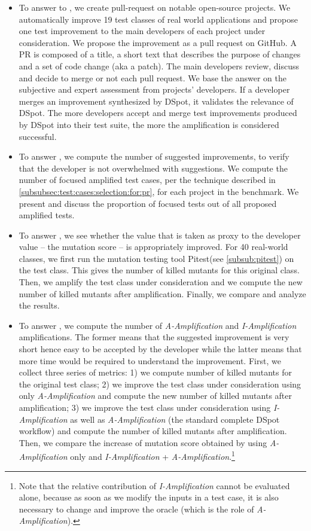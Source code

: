 \documentclass[table,xcdraw,smallextended]{svjour3}
\newcommand{\Iampl}{\emph{I-Amplification}\xspace}
\newcommand{\Aampl}{\emph{A-Amplification}\xspace}
\newcommand{\dspot}{DSpot\xspace}
\newcommand{\gh}{GitHub\xspace}
\newcommand{\pitest}{Pitest\xspace}
\newcommand{\ms}{mutation score\xspace}
\newcommand{\ams}{number of killed mutants\xspace}
\begin{document}
\begin{itemize}
\item \textbf{\rqpullrequest}
To answer to \rqpullrequest, we create pull-request on notable open-source projects.
We automatically improve 19 test classes of real world applications and propose one test improvement to the main developers of each project under consideration. We propose the improvement as a pull request on \gh. A PR is composed of a title, a short text that describes the purpose of changes and a set of code change (aka a patch).
The main developers review, discuss and decide to merge or not each pull request.
We base the answer on the subjective and expert assessment from projects' developers.
If a developer merges an improvement synthesized by \dspot, it validates the relevance of \dspot.
The more developers accept and merge test improvements produced by \dspot into their test suite, the more the amplification is considered successful.


\item \textbf{\rqcandidates{}}
To answer \rqcandidates{}, we compute the number of suggested improvements, to verify that the developer is not overwhelmed with suggestions.
We compute the number of focused amplified test cases, per the technique described in \autoref{subsubsec:test:cases:selection:for:pr}, for each project in the benchmark. We present and discuss the proportion of focused tests out of all proposed amplified tests.

\item \textbf{\rqeffectiveness}
To answer \rqeffectiveness, we see whether the value that is taken as proxy to the developer value -- the mutation score -- is appropriately improved.
For 40 real-world classes, we first run the mutation testing tool \pitest (see \autoref{subsub:pitest}) on the test class. This gives the \ams for this original class. Then, we amplify the test class under consideration and we compute the new \ams after amplification. 
Finally, we compare and analyze the results. 


\item \textbf{\rqAmplVersusIAmpl}
To answer \rqAmplVersusIAmpl, we compute the number of \Aampl{} and \Iampl{} amplifications. The former means that the suggested improvement is very short hence easy to be accepted by the developer while the latter means that more time would be required to understand the improvement.
First, we collect three series of metrics: 
1) we compute \ams for the original test class; 
2) we improve the test class under consideration using only \Aampl{} and compute the new \ams after amplification; 
3) we improve the test class under consideration using \Iampl{} as well as \Aampl{} (the standard complete \dspot workflow) and compute the \ams after amplification. Then, we compare the increase of \ms obtained by using \Aampl{} only and \Iampl{} + \Aampl{}.\footnote{Note that the relative contribution of \Iampl{} cannot be evaluated alone, because as soon as we modify the inputs in a test case, it is also necessary to change and improve the oracle (which is the role of \Aampl{}).}
\end{itemize}
\end{document}
